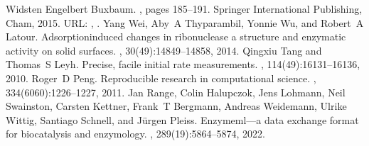 \documentclass[letterpaper,12pt,english]{jupyterBook}
\begin{document}
\begin{sphinxthebibliography}{Widsten }
\sphinxAtStartPar
Engelbert Buxbaum. , pages 185–191. Springer International Publishing, Cham, 2015. URL: , .
\sphinxAtStartPar
Yang Wei, Aby A Thyparambil, Yonnie Wu, and Robert A Latour. Adsorption\sphinxhyphen{}induced changes in ribonuclease a structure and enzymatic activity on solid surfaces. , 30(49):14849–14858, 2014.
\sphinxAtStartPar
Qingxiu Tang and Thomas S Leyh. Precise, facile initial rate measurements. , 114(49):16131–16136, 2010.
\sphinxAtStartPar
Roger D Peng. Reproducible research in computational science. , 334(6060):1226–1227, 2011.
\sphinxAtStartPar
Jan Range, Colin Halupczok, Jens Lohmann, Neil Swainston, Carsten Kettner, Frank T Bergmann, Andreas Weidemann, Ulrike Wittig, Santiago Schnell, and Jürgen Pleiss. Enzymeml—a data exchange format for biocatalysis and enzymology. , 289(19):5864–5874, 2022.
\end{sphinxthebibliography}







\renewcommand{\indexname}{Index}
\printindex
\end{document}
